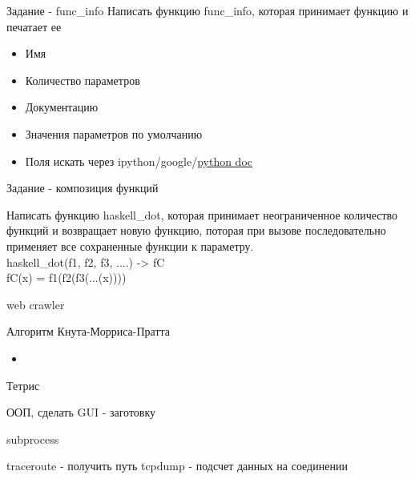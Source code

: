 \documentclass{article}
\begin{document}
{\center Задание - func\_info}
    Написать функцию func\_info, которая принимает функцию и печатает ее
    \begin{itemize}
        \item Имя
        \item Количество параметров
        \item Документацию
        \item Значения параметров по умолчанию
        \item Поля искать через ipython/google/\href{http://docs.python.org/reference/datamodel.html}{python doc}
    \end{itemize}
\newpage
\begin{center}Задание - композиция функций\end{center}
  Написать функцию haskell\_dot, которая принимает неограниченное количество функций
  и возвращает новую функцию, поторая при вызове последовательно применяет все 
  сохраненные функции к параметру. \\

  haskell\_dot(f1, f2, f3, ....) -> fC \\
  fC(x) = f1(f2(f3(...(x))))
\newpage


\begin{center} web crawler \end{center}
\newpage

\begin{center} Алгоритм Кнута-Морриса-Пратта \end{center}
\begin{itemize}
    \item 
\end{itemize}
\newpage

\begin{center} Тетрис \end{center}
ООП, сделать GUI - заготовку
\newpage

\begin{center} subprocess \end{center}
traceroute - получить путь
tcpdump - подсчет данных на соединении
\newpage

\end{document}
